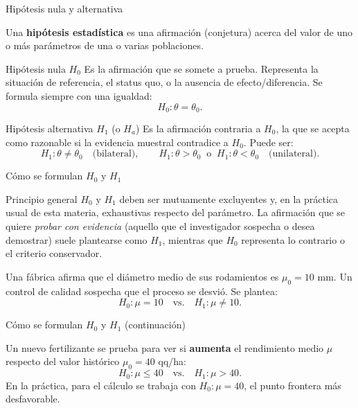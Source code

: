 \documentclass[aspectratio=169,11pt]{beamer}
\begin{document}
\begin{frame}{Hipótesis nula y alternativa}
\begin{definition}
Una \textbf{hipótesis estadística} es una afirmación (conjetura) acerca del valor de uno o más parámetros de una o varias poblaciones.
\end{definition}

\begin{block}{Hipótesis nula $H_0$}
Es la afirmación que se somete a prueba. Representa la situación de referencia, el status quo, o la ausencia de efecto/diferencia. Se formula siempre con una igualdad:
\[
H_0: \theta = \theta_0.
\]
\end{block}

\begin{block}{Hipótesis alternativa $H_1$ (o $H_a$)}
Es la afirmación contraria a $H_0$, la que se acepta como razonable si la evidencia muestral contradice a $H_0$. Puede ser:
\[
H_1: \theta \neq \theta_0 \quad \text{(bilateral)}, \qquad H_1:\theta>\theta_0 \ \text{ o } \ H_1:\theta<\theta_0 \quad \text{(unilateral)}.
\]
\end{block}
\end{frame}

\begin{frame}{Cómo se formulan $H_0$ y $H_1$}
\begin{alertblock}{Principio general}
$H_0$ y $H_1$ deben ser mutuamente excluyentes y, en la práctica usual de esta materia, exhaustivas respecto del parámetro. La afirmación que se quiere \emph{probar con evidencia} (aquello que el investigador sospecha o desea demostrar) suele plantearse como $H_1$, mientras que $H_0$ representa lo contrario o el criterio conservador.
\end{alertblock}

\begin{example}
Una fábrica afirma que el diámetro medio de sus rodamientos es $\mu_0 = 10$ mm. Un control de calidad sospecha que el proceso se desvió. Se plantea:
\[
H_0: \mu = 10 \quad \text{vs.} \quad H_1: \mu \neq 10.
\]
\end{example}

\end{frame}

\begin{frame}{Cómo se formulan $H_0$ y $H_1$ (continuación)}
\begin{example}
Un nuevo fertilizante se prueba para ver si \textbf{aumenta} el rendimiento medio $\mu$ respecto del valor histórico $\mu_0=40$ qq/ha:
\[
H_0: \mu \le 40 \quad \text{vs.} \quad H_1: \mu > 40.
\]
En la práctica, para el cálculo se trabaja con $H_0:\mu=40$, el punto frontera más desfavorable.
\end{example}
\end{frame}
\end{document}
